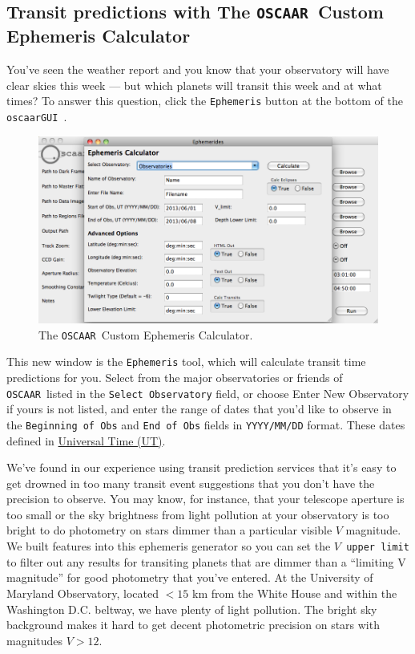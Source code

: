 \documentclass[a4paper]{article}
\newcommand{\code}[1]{\texttt{#1}}
\newcommand{\oscaar}{\code{OSCAAR}~}
\newcommand{\gui}{\code{oscaarGUI}~}
\begin{document}
\subsection{Transit predictions with The \oscaar Custom Ephemeris Calculator}
You've seen the weather report and you know that your observatory will have clear skies this week --- but which planets will transit this week and at what times? To answer this question, click the \code{Ephemeris} button at the bottom of the \gui.
\begin{figure}[H]
\begin{center}
\includegraphics[scale=0.35]{imgs/ephemeris.png}
\caption{The \oscaar Custom Ephemeris Calculator.}
\label{fig:gui}
\end{center}	
\end{figure}
This new window is the \code{Ephemeris} tool, which will calculate transit time predictions for you. Select from the major observatories or friends of \oscaar listed in the \code{Select Observatory} field, or choose Enter New Observatory if yours is not listed, and enter the range of dates that you'd like to observe in the \code{Beginning of Obs} and \code{End of Obs} fields in \code{YYYY/MM/DD} format.  These dates defined in \href{http://en.wikipedia.org/wiki/Universal_time}{Universal Time (UT)}.

We've found in our experience using transit prediction services that it's easy to get drowned in too many transit event suggestions that you don't have the precision to observe. You may know, for instance, that your telescope aperture is too small or the sky brightness from light pollution at your observatory is too bright to do photometry on stars dimmer than a particular visible $V$ magnitude. We built features into this ephemeris generator so you can set the \code{$V$ upper limit} to filter out any results for transiting planets that are dimmer than a ``limiting V magnitude'' for good photometry that you've entered. At the University of Maryland Observatory, located $<15$ km from the White House and within the Washington D.C. beltway, we have plenty of light pollution. The bright sky background makes it hard to get decent photometric precision on stars with magnitudes $V>12$.
\end{document}
